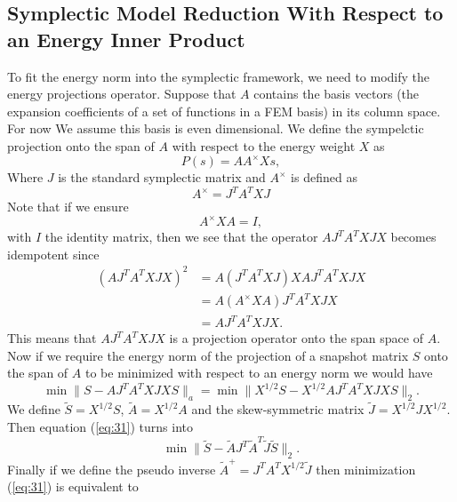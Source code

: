 \documentclass[12pt]{article}
\begin{document}
\subsection{Symplectic Model Reduction With Respect to an Energy Inner Product}
To fit the energy norm into the symplectic framework, we need to modify the energy projections operator. Suppose that $A$ contains the basis vectors (the expansion coefficients of a set of functions in a FEM basis) in its column space. For now We assume this basis is even dimensional. We define the sympelctic projection onto the span of $A$ with respect to the energy weight $X$ as
\begin{equation} \label{eq:28}
	P(s) = AA^\times Xs,
\end{equation}
Where $J$ is the standard symplectic matrix and $A^\times$ is defined as
\begin{equation} \label{eq:29}
	A^\times = J^T A^T X J
\end{equation}
Note that if we ensure
\begin{equation} \label{eq:30}
	A^\times XA=I,
\end{equation}
with $I$ the identity matrix, then we see that the operator $AJ^TA^TXJX$ becomes idempotent since
\begin{equation} \label{eq:31}
\begin{aligned}
	(AJ^TA^TXJX)^2 &= A(J^TA^TXJ)XAJ^TA^TXJX \\
	&= A(A^\times XA)J^TA^TXJX\\
       	&= AJ^TA^TXJX.
\end{aligned}
\end{equation}
This means that $AJ^TA^TXJX$ is a projection operator onto the span space of $A$. Now if we require the energy norm of the projection of a snapshot matrix $S$ onto the span of $A$ to be minimized with respect to an energy norm we would have
\begin{equation} \label{eq:32}
	\min \| S - AJ^TA^TXJX S \|_a = \min \| X^{1/2} S - X^{1/2} AJ^TA^TXJX S \|_2.
\end{equation}
We define $\tilde S = X^{1/2}S$, $\tilde A = X^{1/2} A$ and the skew-symmetric matrix $\tilde J = X^{1/2} J X^{1/2}$. Then equation (\ref{eq:31}) turns into
\begin{equation} \label{eq:33}
	\min \| \tilde S - \tilde A J^T {\tilde A}^T \tilde J \tilde S\|_2.
\end{equation}
Finally if we define the pseudo inverse ${\tilde A }^+ = J^T A^T X^{1/2} \tilde J$ then minimization (\ref{eq:31}) is equivalent to
\end{document}
